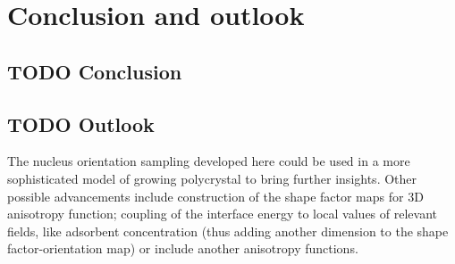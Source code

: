 \chapter{Conclusion and outlook} \label{ch_conclusion}
\section{TODO Conclusion}
	
\section{TODO Outlook}
The nucleus orientation sampling developed here could be used in a more sophisticated model of growing polycrystal to bring further insights. Other possible advancements include construction of the shape factor maps for 3D anisotropy function; coupling of the interface energy to local values of relevant fields, like adsorbent concentration (thus adding another dimension to the shape factor-orientation map) or include another anisotropy functions.
\cleardoublepage

